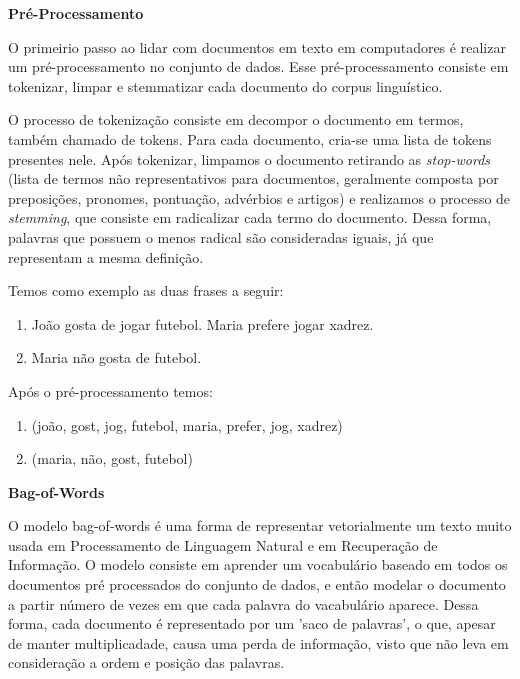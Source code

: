 \documentclass[a4paper,12pt]{article}
\begin{document}
\begin{description}
  \item \textbf{Pré-Processamento}
  
    O primeirio passo ao lidar com documentos em texto em computadores é realizar um pré-processamento no conjunto de dados. Esse 
    pré-processamento consiste em  tokenizar, limpar e stemmatizar cada documento do corpus linguístico. 
    
    O processo de tokenização consiste em decompor o documento em termos, também chamado de  tokens. Para cada documento, cria-se uma lista de 
    tokens presentes nele. Após tokenizar, limpamos o documento retirando  as \textit{stop-words} (lista de termos não representativos para
    documentos, geralmente composta por preposições, pronomes, pontuação, advérbios e artigos) e realizamos o processo de 
    \textit{stemming}, que consiste em radicalizar cada termo do documento. Dessa forma, palavras que possuem o menos radical são consideradas
    iguais, já que representam a mesma definição.
    
    Temos como exemplo as duas frases a seguir:
    
    \begin{center}
      \begin{enumerate}
	\item João gosta de jogar futebol. Maria prefere jogar xadrez.
	\item Maria não gosta de futebol.
      \end{enumerate}
    \end{center}
    

    Após o pré-processamento temos:
    
    \begin{center}
      \begin{enumerate}
	\item (joão, gost, jog, futebol, maria, prefer, jog, xadrez)
	\item (maria, não, gost, futebol)
      \end{enumerate}
    \end{center}
    
    
  \item \textbf{Bag-of-Words}
  
   O modelo bag-of-words é uma forma de representar vetorialmente um texto muito usada em Processamento de Linguagem Natural e em
   Recuperação de Informação. O modelo consiste em aprender um vocabulário baseado em todos
   os documentos pré processados do conjunto de dados, e então modelar o documento a partir número de vezes em que
   cada palavra do vacabulário aparece. Dessa forma, cada documento é representado por um 'saco de palavras', o que, apesar de manter
   multiplicadade, causa uma perda de informação, visto que não leva em consideração a ordem  e posição das palavras.
   

\end{description}
\end{document}
